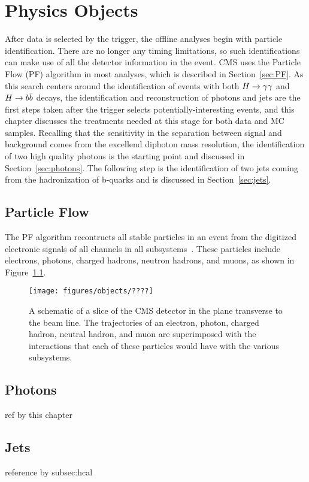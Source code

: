 \chapter{Physics Objects\label{ch:objects}}

After data is selected by the trigger, the offline analyses begin with particle identification.
There are no longer any timing limitations, so such identifications can make use of all the detector
information in the event. CMS uses the Particle Flow (PF) algorithm in most analyses, which is
described in Section~\ref{sec:PF}.
As this search centers around the identification of events with both $H\to\gamma\gamma$ and $H\to b\bar{b}$ decays, the
identification and reconstruction of photons and jets are the first steps taken after the
trigger selects potentially-interesting events,
and this chapter discusses the treatments needed at this stage for both data and MC samples.
Recalling that the sensitivity in the separation between signal and background comes from the
excellend diphoton mass resolution, the identification of two high quality photons is the starting point
and discussed in Section~\ref{sec:photons}. The following step is the identification of two jets
coming from the hadronization of b-quarks and is discussed in Section~\ref{sec:jets}.


\section{Particle Flow\label{sec:PF}}

The PF algorithm recontructs all stable particles in an event from the digitized electronic signals
of all channels in all subsystems~\cite{PFPAS2009,CMS-PAS-PFT-10-001}. These particles include
electrons, photons, charged hadrons, neutron hadrons, and muons, as shown in Figure~\ref{fig:PF}.

\begin{figure}[ht]
 \begin{center}
    \texttt{[image: figures/objects/????]}
      \end{center}
\caption{A schematic of a slice of the CMS detector in the plane transverse to the beam line.
The trajectories of an electron, photon, charged hadron, neutral hadron, and muon are superimposed
with the interactions that each of these particles would have with the various subsystems.}
\label{fig:PF}
\end{figure}





\section{Photons\label{sec:photons}}
ref by this chapter

\section{Jets\label{sec:jets}}
reference by subsec:hcal
